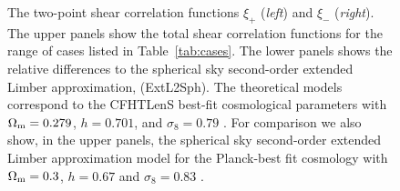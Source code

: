 \documentclass[fleqn,usenatbib]{mnras} %
\begin{document}
\begin{figure}
\begin{center}
  \end{center}

  \caption{The two-point shear correlation functions $\xi_+$ (\emph{left}) and $\xi_-$ (\emph{right}).  The upper panels
  show the total shear correlation functions for the range of cases listed in Table~\ref{tab:cases}.
    The lower panels shows the relative differences to the spherical sky second-order extended Limber approximation, (ExtL2Sph).
     The theoretical models correspond to the CFHTLenS best-fit cosmological parameters with
    $\Omega_{\rm m} = 0.279$, $h=0.701$, and $\sigma_8 = 0.79$ \citep{CFHTLenS-2pt-notomo}.  For comparison we
    	also show, in the upper panels, the spherical sky second-order extended Limber approximation model for the Planck-best fit
    cosmology with $\Omega_{\rm m} = 0.3$, $h=0.67$ and $\sigma_8 = 0.83$ \citep{2015arXiv150201589P}.
  }

  \label{fig:xi_pm}

\end{figure}
\end{document}
